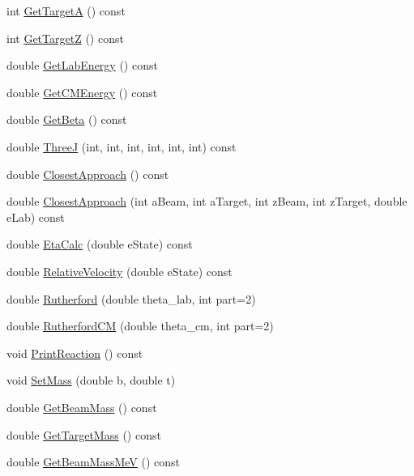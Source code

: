 \begin{DoxyCompactItemize}
\item 
int \hyperlink{classReaction_a88f336aaa15ee243df59dc330c29cd22}{Get\-Target\-A} () const 
\item 
int \hyperlink{classReaction_aaac128357e69dd4172b91e8bc69d045a}{Get\-Target\-Z} () const 
\item 
double \hyperlink{classReaction_adfbcb4fdbe0ee30770cbdb507e5a0779}{Get\-Lab\-Energy} () const 
\item 
double \hyperlink{classReaction_ae27e7830b4d1c5e9023913c7665dc94d}{Get\-C\-M\-Energy} () const 
\item 
double \hyperlink{classReaction_ac735ba532b0e9dae75ec087b6ea76162}{Get\-Beta} () const 
\item 
double \hyperlink{classReaction_ae139c25e4a30dd1251a32ab6d0d5538c}{Three\-J} (int, int, int, int, int, int) const 
\item 
double \hyperlink{classReaction_a73c8c0ec22c962ab3ece453836e074fa}{Closest\-Approach} () const 
\item 
double \hyperlink{classReaction_a27a288df5efb87fb7c4b31702d313bba}{Closest\-Approach} (int a\-Beam, int a\-Target, int z\-Beam, int z\-Target, double e\-Lab) const 
\item 
double \hyperlink{classReaction_ac17706fded988c9a5c126de025567a6b}{Eta\-Calc} (double e\-State) const 
\item 
double \hyperlink{classReaction_aaa0710c49d0b08575aa34ba1feefa00a}{Relative\-Velocity} (double e\-State) const 
\item 
double \hyperlink{classReaction_ab9e972e6be388fee7c9a38652991052c}{Rutherford} (double theta\-\_\-lab, int part=2)
\item 
double \hyperlink{classReaction_a9fdc487d0ef8e6286fe7385a24237b65}{Rutherford\-C\-M} (double theta\-\_\-cm, int part=2)
\item 
void \hyperlink{classReaction_aa417a6fcfd67b4fcf3b1c437e255bf48}{Print\-Reaction} () const 
\item 
void \hyperlink{classReaction_a107e59773c72a5e780e688e45093de15}{Set\-Mass} (double b, double t)
\item 
double \hyperlink{classReaction_a9fefc9765c6a0b92a66044ec3102eb71}{Get\-Beam\-Mass} () const 
\item 
double \hyperlink{classReaction_abd899bbe9008abeab0a7d59a148c216d}{Get\-Target\-Mass} () const 
\item 
double \hyperlink{classReaction_a44c4237ac219380c45c1f8aba767ea9e}{Get\-Beam\-Mass\-Me\-V} () const 
\item 

\end{DoxyCompactItemize}
